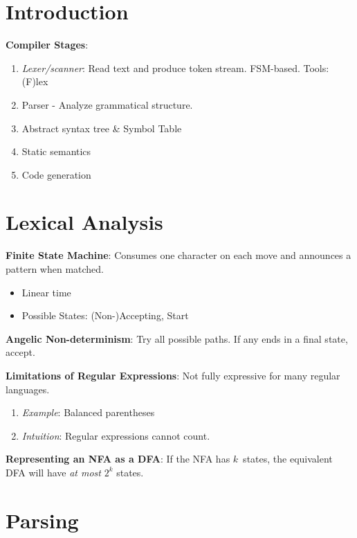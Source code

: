 \documentclass[10pt]{report}
\begin{document}
  \begin{multicols}{2}
    \section{Introduction}
    
    \textbf{Compiler Stages}:
    \begin{enumerate}
      \item \textit{Lexer/scanner}: Read text and produce token stream. FSM-based.  Tools: (F)lex
      \item Parser - Analyze grammatical structure.
      \item Abstract syntax tree \& Symbol Table
      \item Static semantics
      \item Code generation
    \end{enumerate}
  
    \section{Lexical Analysis}
    
    \textbf{Finite State Machine}: Consumes one character on each move and announces a pattern when matched.
    \begin{itemize}
      \item Linear time
      \item Possible States: (Non-)Accepting, Start
    \end{itemize}
  
    \textbf{Angelic Non-determinism}: Try all possible paths. If any ends in a final state, accept.
    
    \textbf{Limitations of Regular Expressions}: Not fully expressive for many regular languages.
    \begin{enumerate}
      \item \textit{Example}: Balanced parentheses
      \item \textit{Intuition}: Regular expressions cannot count.
    \end{enumerate}
  
    \textbf{Representing an NFA as a DFA}: If the NFA has $k$~states, the equivalent DFA will have \textit{at most} $2^{k}$ states.
    
    \section{Parsing}
    

\end{multicols}
\end{document}
